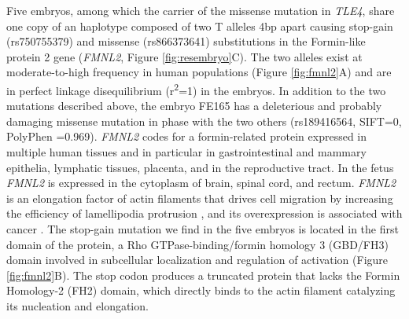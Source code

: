 Five embryos, among which the carrier of the missense mutation in \textit{TLE4}, share one copy of an haplotype composed of two T alleles 4bp apart causing stop-gain (rs750755379) and missense (rs866373641) substitutions in the Formin-like protein 2 gene (\textit{FMNL2}, Figure \ref{fig:resembryo}C). The two alleles exist at moderate-to-high frequency in human populations (Figure \ref{fig:fmnl2}A) and are in perfect linkage disequilibrium (r\textsuperscript{2}=1) in the embryos. In addition to the two mutations described above, the embryo FE165 has a deleterious and probably damaging missense mutation in phase with the two others (rs189416564, SIFT=0, PolyPhen =0.969). \textit{FMNL2} codes for a formin-related protein expressed in multiple human tissues and in particular in gastrointestinal and mammary epithelia, lymphatic tissues, placenta, and in the reproductive tract\cite{gardberg2010characterization}. In the fetus \textit{FMNL2} is expressed in the cytoplasm of brain, spinal cord, and rectum\cite{lizio2015gateways}. \textit{FMNL2} is an elongation factor of actin filaments that drives cell migration by increasing the efficiency of lamellipodia protrusion \cite{block2012fmnl2, kuhn2015structure}, and its overexpression is associated with cancer \cite{zhu2011fmnl2}. The stop-gain mutation we find in the five embryos is located in the first domain of the protein, a Rho GTPase-binding/formin homology 3 (GBD/FH3) domain involved in subcellular localization and regulation of activation (Figure \ref{fig:fmnl2}B). The stop codon produces a truncated protein that lacks the Formin Homology-2 (FH2) domain, which directly binds to the actin filament catalyzing its nucleation and elongation.